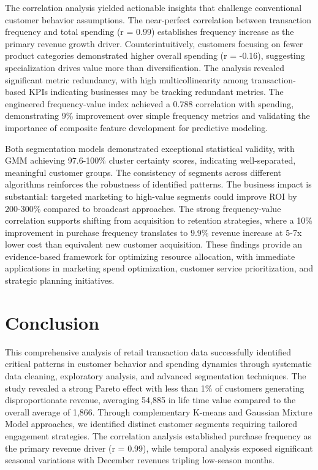 \documentclass[
]{article}
\begin{document}
The correlation analysis yielded actionable insights that challenge
conventional customer behavior assumptions. The near-perfect correlation
between transaction frequency and total spending (r = 0.99) establishes
frequency increase as the primary revenue growth driver.
Counterintuitively, customers focusing on fewer product categories
demonstrated higher overall spending (r = -0.16), suggesting
specialization drives value more than diversification. The analysis
revealed significant metric redundancy, with high multicollinearity
among transaction-based KPIs indicating businesses may be tracking
redundant metrics. The engineered frequency-value index achieved a 0.788
correlation with spending, demonstrating 9\% improvement over simple
frequency metrics and validating the importance of composite feature
development for predictive modeling.

Both segmentation models demonstrated exceptional statistical validity,
with GMM achieving 97.6-100\% cluster certainty scores, indicating
well-separated, meaningful customer groups. The consistency of segments
across different algorithms reinforces the robustness of identified
patterns. The business impact is substantial: targeted marketing to
high-value segments could improve ROI by 200-300\% compared to broadcast
approaches. The strong frequency-value correlation supports shifting
from acquisition to retention strategies, where a 10\% improvement in
purchase frequency translates to 9.9\% revenue increase at 5-7x lower
cost than equivalent new customer acquisition. These findings provide an
evidence-based framework for optimizing resource allocation, with
immediate applications in marketing spend optimization, customer service
prioritization, and strategic planning initiatives.

\section{Conclusion}\label{conclusion}

This comprehensive analysis of retail transaction data successfully
identified critical patterns in customer behavior and spending dynamics
through systematic data cleaning, exploratory analysis, and advanced
segmentation techniques. The study revealed a strong Pareto effect with
less than 1\% of customers generating disproportionate revenue,
averaging 54,885 in life time value compared to the overall average of
1,866. Through complementary K-means and Gaussian Mixture Model
approaches, we identified distinct customer segments requiring tailored
engagement strategies. The correlation analysis established purchase
frequency as the primary revenue driver (r = 0.99), while temporal
analysis exposed significant seasonal variations with December revenues
tripling low-season months.
\end{document}
